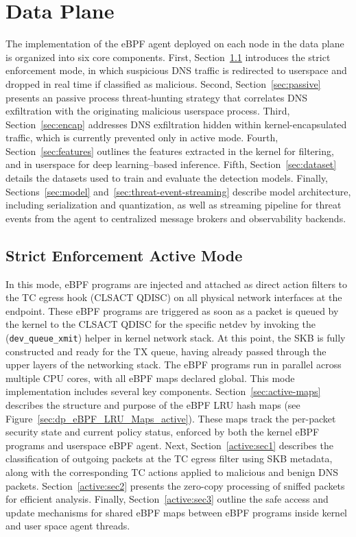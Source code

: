 \documentclass [11pt, proquest] {uwthesis}[2020/02/24]
\begin{document}
\section{Data Plane}
The implementation of the eBPF agent deployed on each node in the data plane is organized into six core components. First, Section~\ref{sec:active} introduces the strict enforcement mode, in which suspicious DNS traffic is redirected to userspace and dropped in real time if classified as malicious. Second, Section~\ref{sec:passive} presents an passive process threat-hunting strategy that correlates DNS exfiltration with the originating malicious userspace process. Third, Section~\ref{sec:encap} addresses DNS exfiltration hidden within kernel-encapsulated traffic, which is currently prevented only in active mode. Fourth, Section~\ref{sec:features} outlines the features extracted in the kernel for filtering, and in userspace for deep learning--based inference. Fifth, Section~\ref{sec:dataset} details the datasets used to train and evaluate the detection models. Finally, Sections~\ref{sec:model} and~\ref{sec:threat-event-streaming} describe model architecture, including serialization and quantization, as well as streaming pipeline for threat events from the agent to centralized message brokers and observability backends.

\subsection{Strict Enforcement Active Mode}
\label{sec:active}
In this mode, eBPF programs are injected and attached as direct action filters to the TC egress hook (CLSACT QDISC) on all physical network interfaces at the endpoint. 
These eBPF programs are triggered as soon as a packet is queued by the kernel to the CLSACT QDISC for the specific netdev by invoking the (\texttt{dev\_queue\_xmit}) helper in kernel network stack. At this point, the SKB is fully constructed and ready for the TX queue, having already passed through the upper layers of the networking stack. The eBPF programs run in parallel across multiple CPU cores, with all eBPF maps declared global.
This mode implementation includes several key components. 
Section~\ref{sec:active-maps} describes the structure and purpose of the eBPF LRU hash maps (see Figure~\ref{sec:dp_eBPF_LRU_Maps_active}). These maps track the per-packet security state and current policy status, enforced by both the kernel eBPF programs and userspace eBPF agent. Next, Section~\ref{active:sec1} describes the classification of outgoing packets at the TC egress filter using SKB metadata, along with the corresponding TC actions applied to malicious and benign DNS packets. Section~\ref{active:sec2} presents the zero-copy processing of sniffed packets for efficient analysis. Finally, Section~\ref{active:sec3} outline the safe access and update mechanisms for shared eBPF maps between eBPF programs inside kernel and user space agent threads.
\end{document}
